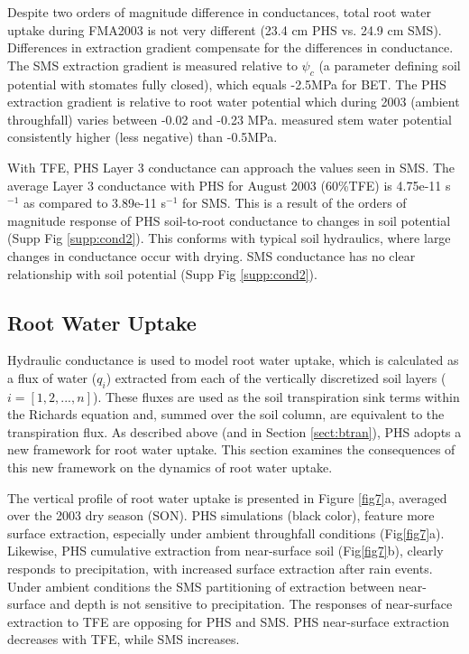 \documentclass[draft,linenumbers]{agujournal}
\begin{document}
Despite two orders of magnitude difference in conductances, total root water uptake during FMA2003 is not very different (23.4 cm PHS vs. 24.9 cm SMS).
Differences in extraction gradient compensate for the differences in conductance.
The SMS extraction gradient is measured relative to $\psi_c$ (a parameter defining soil potential with stomates fully closed), which equals -2.5MPa for BET.
The PHS extraction gradient is relative to root water potential which during 2003 (ambient throughfall) varies between -0.02 and -0.23 MPa.
\citet{fisher2006} measured stem water potential consistently higher (less negative) than -0.5MPa.

With TFE, PHS Layer 3 conductance can approach the values seen in SMS. 
The average Layer 3 conductance with PHS for August 2003 (60\%TFE) is 4.75e-11 s$^{-1}$ as compared to 3.89e-11 s$^{-1}$ for SMS.
This is a result of the orders of magnitude response of PHS soil-to-root conductance to changes in soil potential (Supp Fig \ref{supp:cond2}). 
This conforms with typical soil hydraulics, where large changes in conductance occur with drying.
SMS conductance has no clear relationship with soil potential (Supp Fig \ref{supp:cond2}). 

\subsection{Root Water Uptake}
\label{sect:rwu}

Hydraulic conductance is used to model root water uptake, which is calculated as a flux of water ($q_i$) 
extracted from each of the vertically discretized soil layers ($i=\left[1,2,...,n\right]$).
These fluxes are used as the soil transpiration sink terms within the Richards equation and, summed over the soil column, are equivalent to the transpiration flux.
As described above (and in Section \ref{sect:btran}), PHS adopts a new framework for root water uptake. 
This section examines the consequences of this new framework on the dynamics of root water uptake.

The vertical profile of root water uptake is presented in Figure \ref{fig7}a, averaged over the 2003 dry season (SON). 
PHS simulations (black color), feature more surface extraction, especially under ambient throughfall conditions (Fig\ref{fig7}a).
Likewise, PHS cumulative extraction from near-surface soil (Fig\ref{fig7}b), clearly responds to precipitation, with increased surface extraction after rain events.
Under ambient conditions the SMS partitioning of extraction between near-surface and depth is not sensitive to precipitation.
The responses of near-surface extraction to TFE are opposing for PHS and SMS.
PHS near-surface extraction decreases with TFE, while SMS increases.
\end{document}
